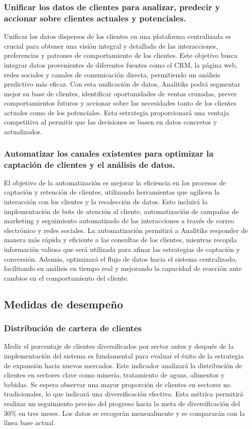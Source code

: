 \documentclass[12pt]{article}
\begin{document}
\subsubsection{Unificar los datos de clientes para analizar, predecir y accionar sobre clientes actuales y potenciales.}
\noindent
Unificar los datos dispersos de los clientes en una plataforma centralizada es crucial para obtener una visión integral y detallada de las interacciones, preferencias y patrones de comportamiento de los clientes. Este objetivo busca integrar datos provenientes de diferentes fuentes como el CRM, la página web, redes sociales y canales de comunicación directa, permitiendo un análisis predictivo más eficaz. Con esta unificación de datos, Analitiks podrá segmentar mejor su base de clientes, identificar oportunidades de ventas cruzadas, prever comportamientos futuros y accionar sobre las necesidades tanto de los clientes actuales como de los potenciales. Esta estrategia proporcionará una ventaja competitiva al permitir que las decisiones se basen en datos concretos y actualizados.
\subsubsection{Automatizar los canales existentes para optimizar la captación de clientes y el análisis de datos.}
\noindent
El objetivo de la automatización es mejorar la eficiencia en los procesos de captación y retención de clientes, utilizando herramientas que agilicen la interacción con los clientes y la recolección de datos. Esto incluirá la implementación de bots de atención al cliente, automatización de campañas de marketing y seguimiento automatizado de las interacciones a través de correo electrónico y redes sociales. La automatización permitirá a Analitiks responder de manera más rápida y eficiente a las consultas de los clientes, mientras recopila información valiosa que será utilizada para afinar las estrategias de captación y conversión. Además, optimizará el flujo de datos hacia el sistema centralizado, facilitando su análisis en tiempo real y mejorando la capacidad de reacción ante cambios en el comportamiento del cliente.


\subsection{Medidas de desempeño}
\subsubsection{Distribución de cartera de clientes}
\noindent
Medir el porcentaje de clientes diversificados por sector antes y después de la implementación del sistema es fundamental para evaluar el éxito de la estrategia de expansión hacia nuevos mercados. Este indicador analizará la distribución de clientes en sectores clave como minería, tratamiento de aguas, alimentos y bebidas. Se espera observar una mayor proporción de clientes en sectores no tradicionales, lo que indicará una diversificación efectiva. Esta métrica permitirá realizar un seguimiento preciso del progreso hacia la meta de diversificación del 30\% en tres meses. Los datos se recogerán mensualmente y se compararán con la línea base actual.
\end{document}
